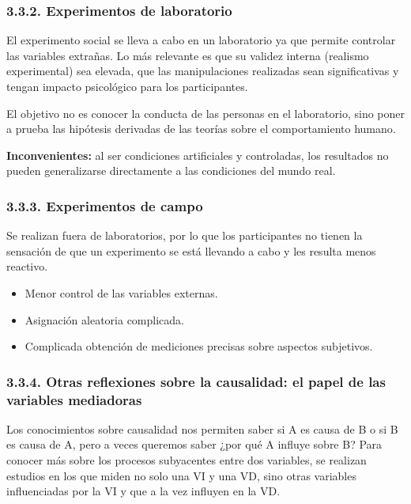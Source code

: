 \documentclass[
]{website}
\providecommand{\tightlist}{%
  \setlength{\itemsep}{0pt}\setlength{\parskip}{0pt}}
\begin{document}
\subsubsection*{3.3.2. Experimentos de laboratorio}\label{subsubtema3_3_2}

El experimento social se lleva a cabo en un laboratorio ya que permite controlar las variables extrañas. Lo más relevante es que su validez interna (realismo experimental) sea elevada, que las manipulaciones realizadas sean significativas y tengan impacto psicológico para los participantes.

El objetivo no es conocer la conducta de las personas en el laboratorio, sino poner a prueba las hipótesis derivadas de las teorías sobre el comportamiento humano.

\textbf{Inconvenientes:} al ser condiciones artificiales y controladas, los resultados no pueden generalizarse directamente a las condiciones del mundo real.

\subsubsection*{3.3.3. Experimentos de campo}\label{subsubtema3_3_3}

Se realizan fuera de laboratorios, por lo que los participantes no tienen la sensación de que un experimento se está llevando a cabo y les resulta menos reactivo.

\begin{itemize}
\tightlist
\item
  Menor control de las variables externas.
\item
  Asignación aleatoria complicada.
\item
  Complicada obtención de mediciones precisas sobre aspectos subjetivos.
\end{itemize}

\subsubsection*{3.3.4. Otras reflexiones sobre la causalidad: el papel de las variables mediadoras}\label{subsubtema3_3_4}

Los conocimientos sobre causalidad nos permiten saber si A es causa de B o si B es causa de A, pero a veces queremos saber ¿por qué A influye sobre B? Para conocer más sobre los procesos subyacentes entre dos variables, se realizan estudios en los que miden no solo una VI y una VD, sino otras variables influenciadas por la VI y que a la vez influyen en la VD.
\end{document}
